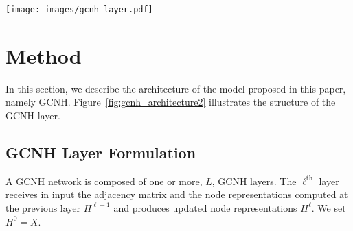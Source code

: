 \documentclass[conference]{IEEEtran}
\begin{document}
\begin{figure*}[t]
\centering
\texttt{[image: images/gcnh\_layer.pdf]}
\caption{Architecture of the GCNH layer. To create an updated representation for the center node (red), the GCNH layer explicitly separates the node from its 1-hop neighborhood (blue). Two different MLPs encode center node and neighborhood separately ($\text{\textsc{mlp}}_u$ and $\text{\textsc{mlp}}_{\mathcal{N}_u}$,  respectively). The encoded neighbors are then aggregated with a permutation invariant function $\bigoplus$. Finally, the aggregated neighborhood and the encoded center node are combined together with a \textit{learnable} weighting factor $\beta$ which regulates the contributions of the center node versus its neighborhood to produce the final output embedding for the node.}
\label{fig:gcnh_architecture2}
\end{figure*}


\section{Method}\label{sec:method}
In this section, we describe the architecture of the model proposed in this paper, namely GCNH. Figure~\ref{fig:gcnh_architecture2} illustrates the structure of the GCNH layer.

\subsection{GCNH Layer Formulation}
A GCNH network is composed of one or more, $L$, GCNH layers.
The $\ell^{\text{th}}$ layer receives in input the adjacency matrix and the node representations computed at the previous layer  $H^{\ell-1}$ and produces updated node representations $H^{\ell}$. We set $H^0=X$.
\end{document}
